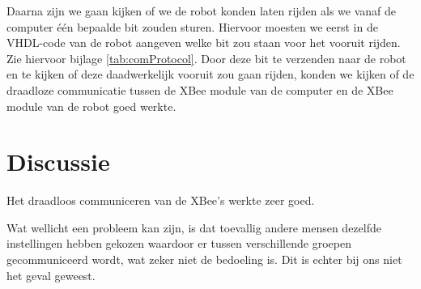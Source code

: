 \documentclass{report}
\begin{document}
Daarna zijn we gaan kijken of we de robot konden laten rijden als we vanaf de computer één bepaalde bit zouden sturen. Hiervoor moesten we eerst in de VHDL-code van de robot aangeven welke bit zou staan voor het vooruit rijden. Zie hiervoor bijlage \ref{tab:comProtocol}. Door deze bit te verzenden naar de robot en te kijken of deze daadwerkelijk vooruit zou gaan rijden, konden we kijken of de draadloze communicatie tussen de XBee module van de computer en de XBee module van de robot goed werkte.

\section{Discussie}

Het draadloos communiceren van de XBee's werkte zeer goed.

Wat wellicht een probleem kan zijn, is dat toevallig andere mensen dezelfde instellingen hebben gekozen waardoor er tussen verschillende groepen gecommuniceerd wordt, wat zeker niet de bedoeling is.
Dit is echter bij ons niet het geval geweest.
\end{document}
